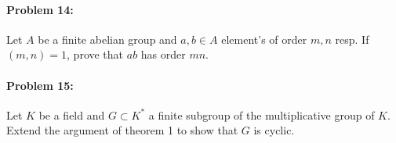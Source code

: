 \paragraph{Problem 14:}
Let \(A\) be a finite abelian group and \(a,b \in A\) element's of order \(m,n\)
resp. If \((m,n)=1\), prove that \(ab\) has order \(mn\).

\paragraph{Problem 15:}
Let \(K\) be a field and \(G \subset K^*\) a finite subgroup of the
multiplicative group of \(K\). Extend the argument of theorem 1 to show that
\(G\) is cyclic.
